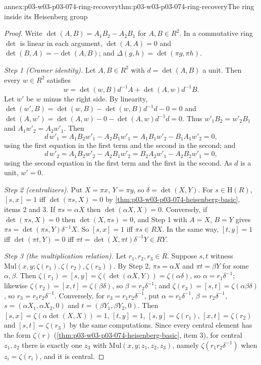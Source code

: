 \begin{annexitem}{annex:p03-w03-p03-074-ring-recovery}{thm:p03-w03-p03-074-ring-recovery}{The ring inside its Heisenberg group}
\begin{proof}
Write \(\det(A,B)=A_1B_2-A_2B_1\) for \(A,B\in R^2\). In a commutative
ring \(\det\) is linear in each argument, \(\det(A,A)=0\) and
\(\det(B,A)=-\det(A,B)\); and \(\Delta(g,h)=\det(\pi g,\pi h)\).

\emph{Step 1 (Cramer identity).} Let \(A,B\in R^2\) with
\(d=\det(A,B)\) a unit. Then every \(w\in R^2\) satisfies
\[
 w=\det(w,B)d^{-1}A+\det(A,w)d^{-1}B .
\]
Let \(w'\) be \(w\) minus the right side. By linearity,
\(\det(w',B)=\det(w,B)-\det(w,B)d^{-1}d-0=0\) and
\(\det(A,w')=\det(A,w)-0-\det(A,w)d^{-1}d=0\). Thus
\(w'_1B_2=w'_2B_1\) and \(A_1w'_2=A_2w'_1\). Then
\[
 d\,w'_1=A_1B_2w'_1-A_2B_1w'_1=A_1B_1w'_2-B_1A_1w'_2=0,
\]
using the first equation in the first term and the second in the second;
and
\[
 d\,w'_2=A_1B_2w'_2-A_2B_1w'_2=B_2A_2w'_1-A_2B_2w'_1=0,
\]
using the second equation in the first term and the first in the second.
As \(d\) is a unit, \(w'=0\).

\emph{Step 2 (centralizers).} Put \(X=\pi x\), \(Y=\pi y\), so
\(\delta=\det(X,Y)\). For \(s\in\mathrm H(R)\),
\([s,x]=1\) iff \(\det(\pi s,X)=0\) by
\cref{thm:p03-w03-p03-074-heisenberg-basic}, items 2 and 3. If
\(\pi s=\alpha X\) then \(\det(\alpha X,X)=0\). Conversely, if
\(\det(\pi s,X)=0\) then \(\det(X,\pi s)=0\), and Step 1 with
\(A=X\), \(B=Y\) gives \(\pi s=\det(\pi s,Y)\delta^{-1}X\). So
\([s,x]=1\) iff \(\pi s\in RX\). In the same way, \([t,y]=1\) iff
\(\det(\pi t,Y)=0\) iff \(\pi t=\det(X,\pi t)\delta^{-1}Y\in RY\).

\emph{Step 3 (the multiplication relation).} Let
\(r_1,r_2,r_3\in R\). Suppose \(s,t\) witness
\(\mathrm{Mul}(x,y;\zeta(r_1),\zeta(r_2),\zeta(r_3))\). By Step 2,
\(\pi s=\alpha X\) and \(\pi t=\beta Y\) for some \(\alpha,\beta\). Then
\(\zeta(r_1)=[s,y]=\zeta(\det(\alpha X,Y))=\zeta(\alpha\delta)\), so
\(\alpha=r_1\delta^{-1}\); likewise
\(\zeta(r_2)=[x,t]=\zeta(\beta\delta)\), so \(\beta=r_2\delta^{-1}\); and
\(\zeta(r_3)=[s,t]=\zeta(\alpha\beta\delta)\), so
\(r_3=r_1r_2\delta^{-1}\). Conversely, for \(r_3=r_1r_2\delta^{-1}\), put
\(\alpha=r_1\delta^{-1}\), \(\beta=r_2\delta^{-1}\),
\(s=(\alpha X_1,\alpha X_2,0)\) and \(t=(\beta Y_1,\beta Y_2,0)\). Then
\([s,x]=\zeta(\alpha\det(X,X))=1\), \([t,y]=1\), \([s,y]=\zeta(r_1)\),
\([x,t]=\zeta(r_2)\) and \([s,t]=\zeta(r_3)\) by the same computations.
Since every central element has the form \(\zeta(r)\)
(\cref{thm:p03-w03-p03-074-heisenberg-basic}, item 3), for central
\(z_1,z_2\) there is exactly one \(z_3\) with
\(\mathrm{Mul}(x,y;z_1,z_2,z_3)\), namely
\(\zeta(r_1r_2\delta^{-1})\) when \(z_i=\zeta(r_i)\), and it is central.


\end{proof}
\end{annexitem}
